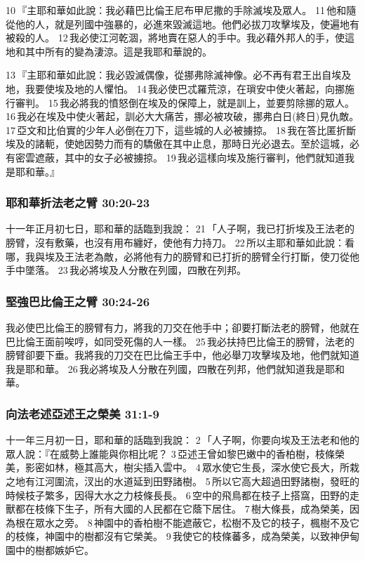 10 『主耶和華如此說：我必藉巴比倫王尼布甲尼撒的手除滅埃及眾人。 11 他和隨從他的人，就是列國中強暴的，必進來毀滅這地。他們必拔刀攻擊埃及，使遍地有被殺的人。 12 我必使江河乾涸，將地賣在惡人的手中。我必藉外邦人的手，使這地和其中所有的變為淒涼。這是我耶和華說的。

13 『主耶和華如此說：我必毀滅偶像，從挪弗除滅神像。必不再有君王出自埃及地，我要使埃及地的人懼怕。 14 我必使巴忒羅荒涼，在瑣安中使火著起，向挪施行審判。 15 我必將我的憤怒倒在埃及的保障上，就是訓上，並要剪除挪的眾人。 16 我必在埃及中使火著起，訓必大大痛苦，挪必被攻破，挪弗白日(終日)見仇敵。 17 亞文和比伯實的少年人必倒在刀下，這些城的人必被擄掠。 18 我在答比匿折斷埃及的諸軛，使她因勢力而有的驕傲在其中止息，那時日光必退去。至於這城，必有密雲遮蔽，其中的女子必被擄掠。 19 我必這樣向埃及施行審判，他們就知道我是耶和華。』

\subsubsection{耶和華折法老之臂 30:20-23}
十一年正月初七日，耶和華的話臨到我說： 21 「人子啊，我已打折埃及王法老的膀臂，沒有敷藥，也沒有用布纏好，使他有力持刀。 22 所以主耶和華如此說：看哪，我與埃及王法老為敵，必將他有力的膀臂和已打折的膀臂全行打斷，使刀從他手中墜落。 23 我必將埃及人分散在列國，四散在列邦。

\subsubsection{堅強巴比倫王之臂 30:24-26}
我必使巴比倫王的膀臂有力，將我的刀交在他手中；卻要打斷法老的膀臂，他就在巴比倫王面前唉哼，如同受死傷的人一樣。 25 我必扶持巴比倫王的膀臂，法老的膀臂卻要下垂。我將我的刀交在巴比倫王手中，他必舉刀攻擊埃及地，他們就知道我是耶和華。 26 我必將埃及人分散在列國，四散在列邦，他們就知道我是耶和華。

\subsubsection{向法老述亞述王之榮美 31:1-9}
十一年三月初一日，耶和華的話臨到我說： 2 「人子啊，你要向埃及王法老和他的眾人說：『在威勢上誰能與你相比呢？ 3 亞述王曾如黎巴嫩中的香柏樹，枝條榮美，影密如林，極其高大，樹尖插入雲中。 4 眾水使它生長，深水使它長大，所栽之地有江河圍流，汊出的水道延到田野諸樹。 5 所以它高大超過田野諸樹，發旺的時候枝子繁多，因得大水之力枝條長長。 6 空中的飛鳥都在枝子上搭窩，田野的走獸都在枝條下生子，所有大國的人民都在它蔭下居住。 7 樹大條長，成為榮美，因為根在眾水之旁。 8 神園中的香柏樹不能遮蔽它，松樹不及它的枝子，楓樹不及它的枝條，神園中的樹都沒有它榮美。 9 我使它的枝條蕃多，成為榮美，以致神伊甸園中的樹都嫉妒它。

